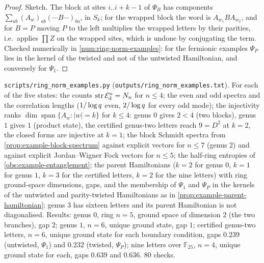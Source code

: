 \begin{proof}
Sketch. The block at sites $i..i+k-1$ of $\Psi_B$ has components $\sum_{ab}(A_w)_{ab}(\cdots B\cdots)_{ba}$,
in $S_k$; for the wrapped block the word is $A_{w_1}BA_{w_2}$, and for $B = P$ moving $P$ to the
left multiplies the wrapped letters by their parities, i.e.\ applies $\prod Z$ on the wrapped
sites, which is undone by conjugating the term. Checked numerically in
\cref{num:ring-norm-examples}: for the fermionic examples $\Psi_P$ lies in the kernel of the
twisted and not of the untwisted Hamiltonian, and conversely for $\Psi_1$.
\end{proof}

\begin{numerical}
\label{num:ring-norm-examples}
\texttt{scripts/ring\_norm\_examples.py} (\texttt{outputs/ring\_norm\_examples.txt}). For each of the
five states: the counts $\operatorname{str}\mathcal E_{\mathrm d}^n = N_{n}$ for $n\le4$; the even and odd spectra and the
correlation lengths ($1/\log q$ even, $2/\log q$ for every odd mode); the injectivity ranks
$\dim\operatorname{span}\{A_w: |w| = k\}$ for $k\le4$: genus $0$ gives $2<4$ (two blocks), genus $1$ gives
$1$ (product state), the certified genus-two letters reach $9 = D^2$ at $k = 2$, the closed
forms are injective at $k = 1$; the block Schmidt spectra from \cref{prop:example-block-spectrum}
against explicit vectors for $n\le7$ (genus $2$) and against explicit Jordan--Wigner Fock
vectors for $n\le5$; the half-ring entropies of \cref{obs:example-entanglement}; the parent
Hamiltonians ($k = 2$ for genus $0$, $k = 1$ for genus $1$, $k = 3$ for the certified letters,
$k = 2$ for the nine letters) with ring ground-space dimensions, gaps, and the membership of
$\Psi_1$ and $\Psi_P$ in the kernels of the untwisted and parity-twisted Hamiltonians as in
\cref{prop:example-parent-hamiltonian}; genus $3$ has sixteen letters and its parent Hamiltonian
is not diagonalised. Results: genus $0$, ring $n = 5$, ground space of dimension $2$ (the two
branches), gap $2$; genus $1$, $n = 6$, unique ground state, gap $1$; certified genus-two
letters, $n = 6$, unique ground state for each boundary condition, gaps $0.239$ (untwisted,
$\Psi_1$) and $0.232$ (twisted, $\Psi_P$); nine letters over $\mathbb F_{25}$, $n = 4$, unique ground
state for each, gaps $0.639$ and $0.636$. $80$ checks.
\end{numerical}
